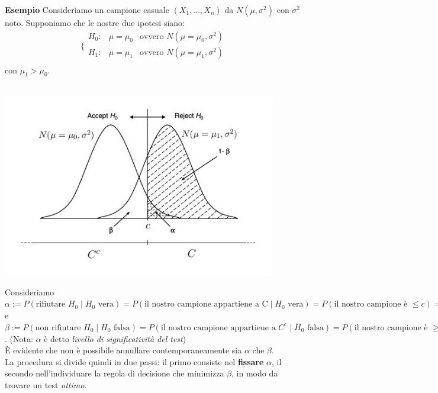 \noindent \textbf{Esempio} Consideriamo un campione casuale $(X_1,...,X_n)$ da $N(\mu,\sigma^2)$ con $\sigma^2$ noto. Supponiamo che le nostre due ipotesi siano:
\\
$$\bigg \{
\begin{array}{lcr}
H_0: & \mu=\mu_0 & \text{ovvero } N(\mu=\mu_0,\sigma^2) \\
H_1: & \mu=\mu_1 & \text{ovvero } N(\mu=\mu_1,\sigma^2) \\
\end{array}
$$
con $\mu_1 > \mu_0$.\\
\\
\begin{center}
\includegraphics [width=12cm] {immagini/grafico_2.jpg}
\end{center}

Consideriamo $\alpha:= P(\text{rifiutare } H_0 \mid H_0 \text{ vera}) = P(\text{il nostro campione appartiene a C} \mid H_0 \text{ vera}) = P(\text{il nostro campione è } \leq c) = P(\text{commettere un errore di I tipo})$ e $\beta:= P(\text{non rifiutare } H_0 \mid H_0 \text{ falsa}) = P(\text{il nostro campione appartiene a } C^c \mid H_0 \text{ falsa}) = P(\text{il nostro campione è } \geq c) = P(\text{commettere un errore di II tipo})$. 
(Nota: $\alpha$ è detto \emph{livello di significatività del test})\\
È evidente che non è possibile annullare contemporaneamente sia $\alpha$ che $\beta$.\\
La procedura si divide quindi in due passi: il primo consiste nel \textbf{fissare} $\alpha$, il secondo nell'individuare la regola di decisione che minimizza $\beta$, in modo da trovare un test \textit{ottimo}.\\
\\
\\